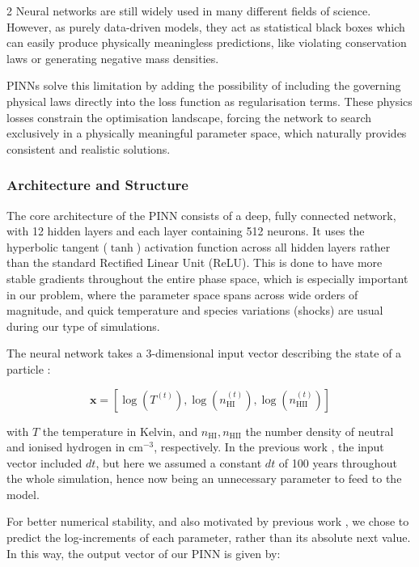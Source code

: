 \documentclass[10pt,a4paper]{article}
\begin{document}
\begin{multicols}{2}
Neural networks are still widely used in many different fields of science. However, as purely data-driven models, they act as statistical black boxes which can easily produce physically meaningless predictions, like violating conservation laws or generating negative mass densities.

PINNs solve this limitation by adding the possibility of including the governing physical laws directly into the loss function as regularisation terms. These physics losses constrain the optimisation landscape, forcing the network to search exclusively in a physically meaningful parameter space, which naturally provides consistent and realistic solutions.

\subsubsection{Architecture and Structure}

The core architecture of the PINN consists of a deep, fully connected network, with 12 hidden layers and each layer containing 512 neurons. It uses the hyperbolic tangent ($\tanh$) activation function across all hidden layers rather than the standard Rectified Linear Unit (ReLU). This is done to have more stable gradients throughout the entire phase space, which is especially important in our problem, where the parameter space spans across wide orders of magnitude, and quick temperature and species variations (shocks) are usual during our type of simulations.

The neural network takes a 3-dimensional input vector describing the state of a particle :

\begin{equation*}
\mathbf{x}=\left[\log(T^{(t)}), \log(n_{\text{HI}}^{(t)}), \log(n_{\text{HII}}^{(t)})\right]
\end{equation*}

with $T$ the temperature in Kelvin, and $n_{\text{HI}}, n_{\text{HII}}$ the number density of neutral and ionised hydrogen in $\text{cm}^{-3}$, respectively. In the previous work \cite{bourrat2026}, the input vector included $dt$, but here we assumed a constant $dt$ of 100 years throughout the whole simulation, hence now being an unnecessary parameter to feed to the model.

For better numerical stability, and also motivated by previous work \cite{bourrat2026}, we chose to predict the log-increments of each parameter, rather than its absolute next value. In this way, the output vector of our PINN is given by:


\end{multicols}
\end{document}
